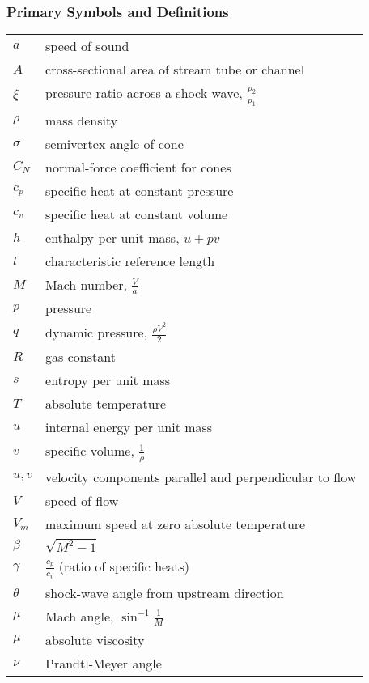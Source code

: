 \subsubsection{Primary Symbols and Definitions}

\begin{flushleft}
\renewcommand{\arraystretch}{1.3} %
\begin{tabular}{ll}
$a$ & speed of sound \\
$A$ & cross-sectional area of stream tube or channel \\
$\xi$ & pressure ratio across a shock wave, $ \frac{p_2}{p_1} $ \\
$\rho$ & mass density \\
$\sigma$ & semivertex angle of cone \\
$C_N$ & normal-force coefficient for cones \\
$c_p$ & specific heat at constant pressure \\
$c_v$ & specific heat at constant volume \\
$h$ & enthalpy per unit mass, $ u + pv $ \\
$l$ & characteristic reference length \\
$M$ & Mach number, $ \frac{V}{a} $ \\
$p$ & pressure \\
$q$ & dynamic pressure, $ \frac{\rho V^2}{2} $ \\
$R$ & gas constant \\
$s$ & entropy per unit mass \\
$T$ & absolute temperature \\
$u$ & internal energy per unit mass \\
$v$ & specific volume, $ \frac{1}{\rho} $ \\
$u,v$ & velocity components parallel and perpendicular to flow \\
$V$ & speed of flow \\
$V_m$ & maximum speed at zero absolute temperature \\
$\beta$ & $ \sqrt{M^2 - 1} $ \\
$\gamma$ & $ \frac{c_p}{c_v} $ (ratio of specific heats) \\
$\theta$ & shock-wave angle from upstream direction \\
$\mu$ & Mach angle, $ \sin^{-1} \frac{1}{M} $ \\
$\mu$ & absolute viscosity \\
$\nu$ & Prandtl-Meyer angle \\
\end{tabular}
\end{flushleft}

